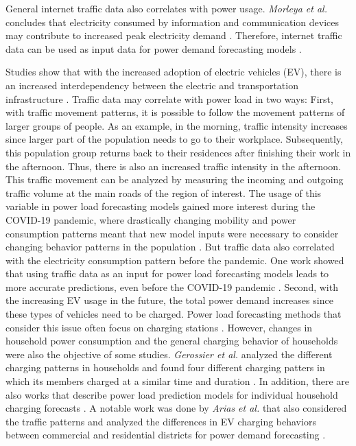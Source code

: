 General internet traffic data also correlates with power usage.
\textit{Morleya et al.} concludes that 
electricity consumed by information and communication devices
may contribute to increased peak electricity demand 
\cite{internettrafficenergycorrelation}.
Therefore, internet traffic data can be used as input data for 
power demand forecasting models \cite{electricityinternetforecast}. 

Studies show that with the increased adoption of electric vehicles (EV), 
there is an increased interdependency between the electric and 
transportation infrastructure \cite{interdependnytrafficenergy}. 
Traffic data may correlate with power load in two ways:
First, with traffic movement patterns, it is possible to follow the
movement patterns of larger groups of people. As an example, in the morning,
traffic intensity increases since larger part of the population needs
to go to their workplace. Subsequently, this population group
returns back to their residences after finishing their work in the afternoon.
Thus, there is also an increased traffic intensity in the afternoon.
This traffic movement can be analyzed by measuring the 
incoming and outgoing traffic volume at the main roads of the 
region of interest. The usage of this variable in power load
forecasting models gained more interest during the COVID-19 pandemic, 
where drastically changing mobility and power consumption 
patterns meant that new model inputs were necessary to consider changing
behavior patterns in the population 
\cite{covidtrafficpower} \cite{covidtrafficpower2}.
But traffic data also correlated with the electricity consumption pattern
before the pandemic. One work showed that
using traffic data as an input for power load
forecasting models leads to more accurate predictions, even before
the COVID-19 pandemic \cite{causalmodeltrafficelectricity}.
Second, with the increasing EV usage in the future, 
the total power demand increases since these types of vehicles 
need to be charged. Power load forecasting methods that consider this
issue often focus on charging stations \cite{evcharchingstations}
\cite{evcharchingstations2}. However, changes in household power consumption 
and the general charging behavior of households
were also the objective of some studies. \textit{Gerossier et al.}
analyzed the different charging patterns in households
and found four different charging patters in which its members charged at 
a similar time and duration \cite{gerossier2019modeling}.
In addition, there are also works that describe
power load prediction models for individual household
charging forecasts \cite{skala2023interval}. 
A notable work was done by \textit{Arias et al.} that also considered the traffic patterns
and analyzed the differences in EV charging behaviors between
commercial and residential districts for power demand forecasting
\cite{arias2016electric}.

